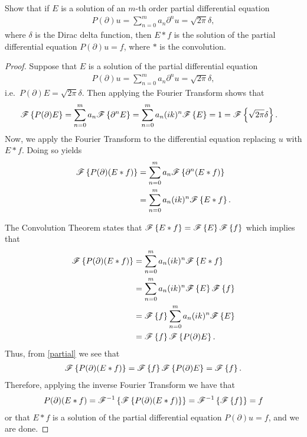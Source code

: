 \begin{problem}{9}
  Show that if $E$ is a solution of an $m$-th order partial differential equation
  \begin{align*}
    P(\partial)u = \sum_{n=0}^m a_n \partial^n u = \sqrt{2\pi} \delta,
  \end{align*}
  where $\delta$ is the Dirac delta function, then $E \ast f$ is the solution of
  the partial differential equation $P(\partial)u = f$, where $\ast$ is the convolution.
\end{problem}

\begin{proof}
  Suppose that $E$ is a solution of the partial differential equation
  \begin{align*}
    P(\partial)u = \sum_{n=0}^m a_n \partial^n u = \sqrt{2\pi} \delta,
  \end{align*}
  i.e.\ $P(\partial)E = \sqrt{2\pi}\delta$. Then applying the Fourier Transform
  shows that
  \begin{align}\label{partial}
    \mathscr{F}\left\{ {P(\partial)E} \right\} &= \sum_{n=0}^m a_n \mathscr{F}\left\{ {\partial^n E} \right\}
    = \sum_{n=0}^m a_n (ik)^n \mathscr{F}\left\{ {E} \right\} = 1 = \mathscr{F}\left\{ {\sqrt{2\pi} \delta} \right\}.
  \end{align}
  Now, we apply the Fourier Transform to the differential
  equation replacing $u$ with $E \ast f$. Doing so yields
  \begin{align*}
    \mathscr{F}\left\{ {P(\partial)(E\ast f)} \right\} &= \sum_{n=0}^m a_n \mathscr{F}\left\{ {\partial^n (E\ast f)} \right\} \\
    &=  \sum_{n=0}^m a_n (ik)^n\mathscr{F}\left\{ {E\ast f} \right\}.
  \end{align*}

  The Convolution Theorem states that $\mathscr{F}\left\{ {E \ast f} \right\} = \mathscr{F}\left\{ {E} \right\}\mathscr{F}\left\{ {f} \right\}$ which implies that
  \begin{align*}
    \mathscr{F}\left\{ {P(\partial)(E\ast f)} \right\}
    &=  \sum_{n=0}^m a_n (ik)^n\mathscr{F}\left\{ {E\ast f} \right\} \\
    &=  \sum_{n=0}^m a_n (ik)^n\mathscr{F}\left\{ {E} \right\}\mathscr{F}\left\{ {f} \right\} \\
    &=  \mathscr{F}\left\{ {f} \right\}\sum_{n=0}^m a_n (ik)^n\mathscr{F}\left\{ {E} \right\} \\
    &= \mathscr{F}\left\{ {f} \right\}\mathscr{F}\left\{ {P(\partial)E} \right\}.
  \end{align*}
  Thus, from \eqref{partial} we see that
  \begin{align*}
    \mathscr{F}\left\{ {P(\partial)(E\ast f)} \right\} =  \mathscr{F}\left\{ {f} \right\}\mathscr{F}\left\{ {P(\partial)E} \right\} = \mathscr{F}\left\{ {f} \right\}.
  \end{align*}
  Therefore, applying the inverse Fourier Transform we have that
  \begin{align*}
    P(\partial)(E\ast f) = \mathscr{F}^{-1}\left\{ {\mathscr{F}\left\{ {P(\partial)(E\ast f)} \right\}} \right\} = \mathscr{F}^{-1}\left\{ {\mathscr{F}\left\{ {f} \right\}} \right\} = f
  \end{align*}
  or that $E\ast f$ is a solution of the partial differential equation $P(\partial)u =f$, and we are done.
\end{proof}
\newpage
